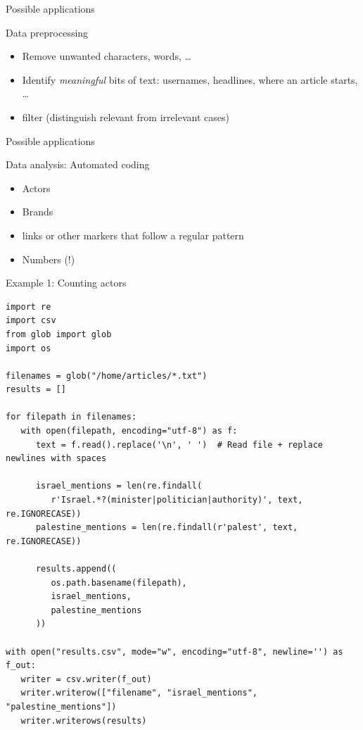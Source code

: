 \begin{frame}{Possible applications}
\begin{block}{Data preprocessing}
\begin{itemize}
\item Remove unwanted characters, words, \ldots
\item Identify \emph{meaningful} bits of text: usernames, headlines, where an article starts, \ldots
\item filter (distinguish relevant from irrelevant cases)
\end{itemize}
\end{block}
\end{frame}


\begin{frame}{Possible applications}
\begin{block}{Data analysis: Automated coding}
\begin{itemize}
\item Actors
\item Brands
\item links or other markers that follow a regular pattern
\item Numbers (!)
\end{itemize}
\end{block}
\end{frame}

\begin{frame}{Example 1: Counting actors}
\begin{verbatim}
import re
import csv
from glob import glob
import os

filenames = glob("/home/articles/*.txt")
results = []

for filepath in filenames:
   with open(filepath, encoding="utf-8") as f:
      text = f.read().replace('\n', ' ')  # Read file + replace newlines with spaces
      
      israel_mentions = len(re.findall(
         r'Israel.*?(minister|politician|authority)', text, re.IGNORECASE))
      palestine_mentions = len(re.findall(r'palest', text, re.IGNORECASE))
      
      results.append((
         os.path.basename(filepath),
         israel_mentions,
         palestine_mentions
      ))

with open("results.csv", mode="w", encoding="utf-8", newline='') as f_out:
   writer = csv.writer(f_out)
   writer.writerow(["filename", "israel_mentions", "palestine_mentions"])
   writer.writerows(results)
\end{verbatim}
\end{frame}
   


